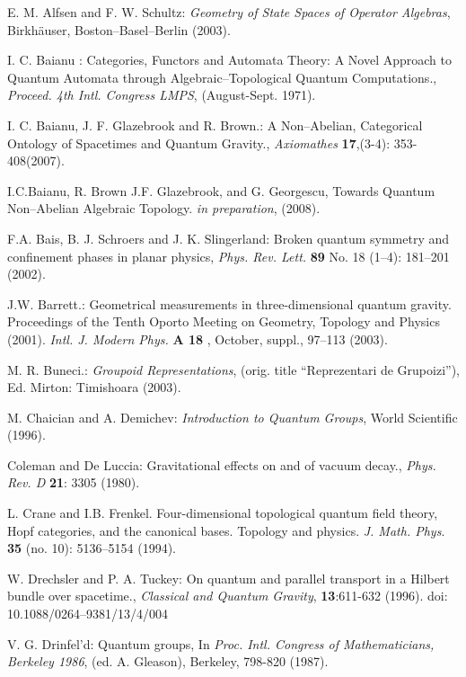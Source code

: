 \documentclass[12pt]{article}
\theoremstyle{plain}
\theoremstyle{definition}
\numberwithin{equation}{section}
\newcommand{\<}{{\langle}}
\begin{document}
\begin{thebibliography}{9}

E. M. Alfsen and F. W. Schultz: \emph{Geometry of State Spaces of Operator Algebras}, Birkh\"auser, Boston--Basel--Berlin (2003).

I. C. Baianu : Categories, Functors and Automata Theory: A Novel Approach to Quantum Automata through Algebraic--Topological Quantum Computations., \textit{Proceed. 4th Intl. Congress LMPS}, (August-Sept. 1971).

I. C. Baianu, J. F. Glazebrook and R. Brown.: A Non--Abelian, Categorical Ontology of Spacetimes and Quantum Gravity., \emph{Axiomathes} \textbf{17},(3-4): 353-408(2007).

I.C.Baianu, R. Brown J.F. Glazebrook, and G. Georgescu, Towards Quantum Non--Abelian Algebraic Topology. \textit{in preparation}, (2008).

F.A. Bais, B. J. Schroers and J. K. Slingerland: Broken quantum symmetry and confinement phases in planar physics, \emph{Phys. Rev. Lett.} \textbf{89} No. 18 (1--4): 181--201 (2002).

J.W. Barrett.: Geometrical measurements in three-dimensional quantum gravity.
Proceedings of the Tenth Oporto Meeting on Geometry, Topology and Physics (2001).
\textit{Intl. J. Modern Phys.} \textbf{A 18} , October, suppl., 97--113 (2003).

M. R. Buneci.: \emph{Groupoid Representations}, (orig. title ``Reprezentari de Grupoizi''),
Ed. Mirton: Timishoara (2003). 

M. Chaician and A. Demichev: \emph{Introduction to Quantum Groups}, World Scientific (1996).

Coleman and De Luccia: Gravitational effects on and of vacuum decay., \emph{Phys. Rev. D} \textbf{21}: 3305 (1980).

L. Crane and I.B. Frenkel. Four-dimensional topological quantum field theory, Hopf categories, and the canonical bases. Topology and physics. \textit{J. Math. Phys}. \textbf{35} (no. 10): 5136--5154 (1994).

W. Drechsler and P. A. Tuckey:  On quantum and parallel transport in a Hilbert bundle over spacetime., \emph{Classical and Quantum Gravity}, \textbf{13}:611-632 (1996).
doi: 10.1088/0264--9381/13/4/004

V. G. Drinfel'd: Quantum groups, In \emph{Proc. Intl. Congress of
Mathematicians, Berkeley 1986}, (ed. A. Gleason), Berkeley, 798-820 (1987).


\end{thebibliography}
\end{document}
